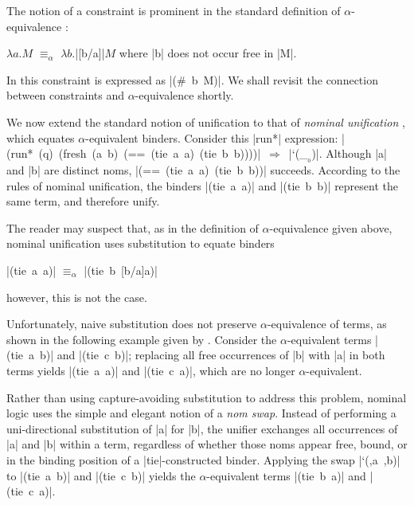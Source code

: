The notion of a constraint is prominent in the standard definition of $\alpha$-equivalence \cite{stoy}:

\wspace

\centerline{$\lambda a.M$ $\equiv _{\alpha}$ $\lambda b.$\scheme|[b/a]|$M$
where \scheme|b| does not occur free in \scheme|M|.}

\wspace

\noindent In \alphakanrensp this constraint is expressed as \mbox{\scheme|(# b M)|}.
We shall revisit the connection between constraints and $\alpha$-equivalence shortly.

We now extend the standard notion of unification to that of \emph{nominal unification} \cite{Urban-Pitts-Gabbay/04}, which equates $\alpha$-equivalent binders.  Consider this \scheme|run*| expression:
\mbox{\scheme|(run* (q) (fresh (a b) (== (tie a a) (tie b b))))| $\Rightarrow$ \schemeresult|`(_$_{_{0}}$)|}.
Although \scheme|a| and \scheme|b| are distinct noms, \mbox{\scheme|(== (tie a a) (tie b b))|} succeeds.  According to the rules of nominal unification, the binders \mbox{\scheme|(tie a a)|} and \mbox{\scheme|(tie b b)|} represent the same term, and therefore unify.

The reader may suspect that, as in the definition of $\alpha$-equivalence 
given above, nominal unification uses substitution to equate binders

\wspace

\centerline{\mbox{\scheme|(tie a a)|} $\equiv _{\alpha}$ \mbox{\scheme|(tie b [b/a]a)|}}

\wspace

\noindent however, this is not the case.

Unfortunately, naive substitution does not preserve
$\alpha$-equivalence of terms, as shown in the following example given
by \citet{Urban-Pitts-Gabbay/04}. Consider the $\alpha$-equivalent
terms \mbox{\scheme|(tie a b)|} and \mbox{\scheme|(tie c b)|};
replacing all free occurrences of \scheme|b| with \scheme|a| in both
terms yields \mbox{\scheme|(tie a a)|} and \mbox{\scheme|(tie c a)|},
which are no longer $\alpha$-equivalent.

Rather than using capture-avoiding substitution to address this
problem, nominal logic uses the simple and elegant notion of a
\emph{nom swap}.  Instead of performing a uni-directional substitution
of \scheme|a| for \scheme|b|, the unifier exchanges all occurrences of
\scheme|a| and \scheme|b| within a term, regardless of whether those
noms appear free, bound, or in the binding position of a
\scheme|tie|-constructed binder.  Applying the swap \mbox{\scheme|`(,a ,b)|}
 to \mbox{\scheme|(tie a b)|} and \mbox{\scheme|(tie c b)|}
yields the $\alpha$-equivalent terms \mbox{\scheme|(tie b a)|} and
\mbox{\scheme|(tie c a)|}.

